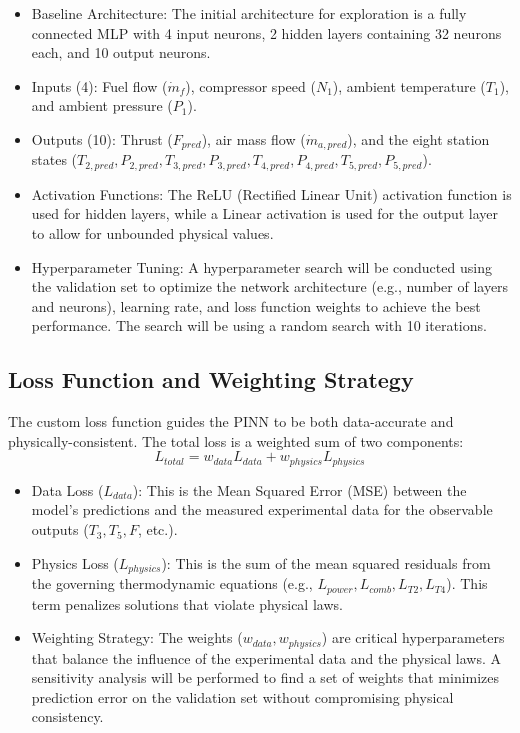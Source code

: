 \documentclass[
  12pt,
  oneside,
  a4paper,
  english,
  brazil]{abntex2}
\providecommand{\tightlist}{%
  \setlength{\itemsep}{0pt}\setlength{\parskip}{0pt}}
\begin{document}
\begin{itemize}
\tightlist
\item
  Baseline Architecture: The initial architecture for exploration is a
  fully connected MLP with 4 input neurons, 2 hidden layers containing
  32 neurons each, and 10 output neurons.
\item
  Inputs (4): Fuel flow (\(\dot{m}_f\)), compressor speed (\(N_1\)),
  ambient temperature (\(T_1\)), and ambient pressure (\(P_1\)).
\item
  Outputs (10): Thrust (\(F_{pred}\)), air mass flow
  (\(\dot{m}_{a,pred}\)), and the eight station states
  (\(T_{2,pred}, P_{2,pred}, T_{3,pred}, P_{3,pred}, T_{4,pred}, P_{4,pred}, T_{5,pred}, P_{5,pred}\)).
\item
  Activation Functions: The ReLU (Rectified Linear Unit) activation
  function is used for hidden layers, while a Linear activation is used
  for the output layer to allow for unbounded physical values.
\item
  Hyperparameter Tuning: A hyperparameter search will be conducted using
  the validation set to optimize the network architecture (e.g., number
  of layers and neurons), learning rate, and loss function weights to
  achieve the best performance. The search will be using a random search
  with 10 iterations.
\end{itemize}

\subsection{Loss Function and Weighting
Strategy}\label{loss-function-and-weighting-strategy}

The custom loss function guides the PINN to be both data-accurate and
physically-consistent. The total loss is a weighted sum of two
components: \[
L_{total} = w_{data} L_{data} + w_{physics} L_{physics}
\]

\begin{itemize}
\tightlist
\item
  Data Loss (\(L_{data}\)): This is the Mean Squared Error (MSE) between
  the model's predictions and the measured experimental data for the
  observable outputs (\(T_3, T_5, F\), etc.).
\item
  Physics Loss (\(L_{physics}\)): This is the sum of the mean squared
  residuals from the governing thermodynamic equations (e.g.,
  \(L_{power}, L_{comb}, L_{T2}, L_{T4}\)). This term penalizes
  solutions that violate physical laws.
\item
  Weighting Strategy: The weights (\(w_{data}, w_{physics}\)) are
  critical hyperparameters that balance the influence of the
  experimental data and the physical laws. A sensitivity analysis will
  be performed to find a set of weights that minimizes prediction error
  on the validation set without compromising physical consistency.
\end{itemize}
\end{document}

